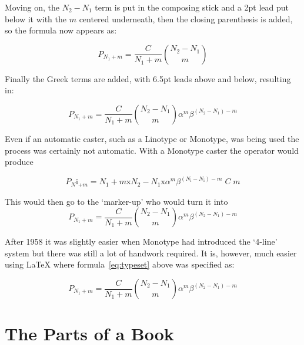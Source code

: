 \documentclass[10pt,a4paper,extrafontsizes]{memoir}
\begin{document}
\begin{paracol}{2}
   Moving on, the $N_{2}-N_{1}$ term is put in the composing stick and a 2pt
lead put below it with the $m$ centered underneath, then the closing parenthesis
is added, so the formula now appears as:

\begin{displaymath}
P_{N_1 + m} = \frac{C}{N_{1} + m} \binom{N_{2} - N_{1}}{m}
\end{displaymath}
 
    Finally the Greek terms are added, with 6.5pt leads above and below, 
resulting in:

\begin{displaymath}
P_{N_1 + m} = \frac{C}{N_{1} + m} \binom{N_{2} - N_{1}}{m}
              \alpha^{m}\beta^{(N_{2}-N_{1}) - m}
\end{displaymath}

    Even if an automatic caster, such as a Linotype or Monotype, was being 
used the process was certainly not automatic. With a 
Monotype caster the 
operator would produce

\providecommand*{\tmri}{\mathrm{i}}
\providecommand*{\tmrx}{\mathrm{x}}
\begin{displaymath}
P_{N}\tmri_{+m} = N_{1} + m\tmrx N_{2}-N_{1}\tmrx \alpha^{m}\beta^{(N_{\tmri}-N_{\tmri}) - m} \; C \; m
\end{displaymath}

This would then go to the `marker-up' who would turn it into
\begin{displaymath}
P_{N_1 + m} = \frac{C}{N_{1} + m} \binom{N_{2} - N_{1}}{m}
              \alpha^{m}\beta^{(N_{2}-N_{1}) - m}
\end{displaymath}

After 1958 it was slightly easier when Monotype had introduced the 
`4-line' system but there was still a lot of handwork required. 
It is, however, much easier using LaTeX where 
formula~\ref{eq:typeset} above was specified as:
\begin{lcode}
\begin{equation}
P_{N_1 + m} = \frac{C}{N_{1} + m} \binom{N_{2} - N_{1}}{m}
              \alpha^{m}\beta^{(N_{2}-N_{1}) - m}
\end{equation}
\end{lcode}
\end{paracol}


\chapter{The Parts of a Book}
\end{document}
